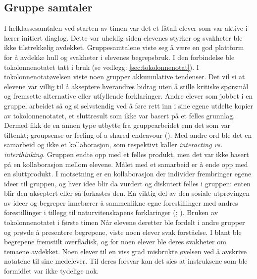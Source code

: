 \documentclass[main.tex]{subfiles}
\begin{document}
\subsection*{Gruppe samtaler}
I helklassesamtalen ved starten av timen var det et fåtall elever som var aktive i lærer initiert 
diaglog. Dette var uheldig siden elevenes styrker og svakheter ble ikke tilstrekkelig avdekket. 
Gruppesamtalene viste seg å være en god plattform for å avdekke hull og svakheter i elevenes 
begrepsbruk. I den forbindelse ble tokolonnenotatet tatt i bruk (se vedlegg: 
\ref{sec:tokolonnenotat}).
\newline
\newline
I tokolonnenotatøvelsen viste noen grupper akkumulative tendenser. Det vil si at elevene 
var villig til å akseptere hverandres bidrag uten å stille kritiske spørsmål og fremsette
alternative eller utfyllende forklaringer. Andre elever som jobbet i en gruppe, arbeidet så og si
selvstendig ved å føre rett inn i sine egene utdelte kopier av tokolonnenotatet, et sluttresult som 
ikke var basert på et felles grunnlag. Dermed fikk de en annen type utbytte fra gruppearbeidet
enn det som var tiltenkt; \guillemotleft groupsense or feeling of a shared endeavour
\guillemotright (). Med andre ord ble det en samarbeid og ikke 
et kollaborasjon, som  respektivt kaller \emph{interacting vs. interthinking}. 
Gruppen endte opp med et felles produkt, men det var ikke basert på en kollaborasjon mellom elevene. 
Målet med et samarbeid er å ende opp med en sluttprodukt. I motsetning er en kollaborasjon der 
individer frembringer egene ideer til gruppen, og hver idee blir da vurdert og diskutert felles i 
gruppen: enten blir den akseptert eller så forkastes den.
\newline
\newline
En viktig del av den sosiale utprøvingen av ideer og begreper innebærer å sammenlikne egne 
forestillinger med andres forestillinger i tillegg til naturvitenskapens forklaringer 
(; ). Bruken av tokolonnenotatet i første timen 
\newline
\newline
Når elevene deretter ble fordelt i andre grupper og prøvde å presentere begrepene, viste noen elever 
svak forståelse. I blant ble begrepene fremstilt overfladisk, og for noen elever ble deres svakheter 
om temaene avdekket. Noen elever til en viss grad misbrukte øvelsen ved å avskrive notatene til sine 
medelever. Til deres forsvar kan det sies at instruksene som ble formidlet var ikke tydelige nok. 
\end{document}
